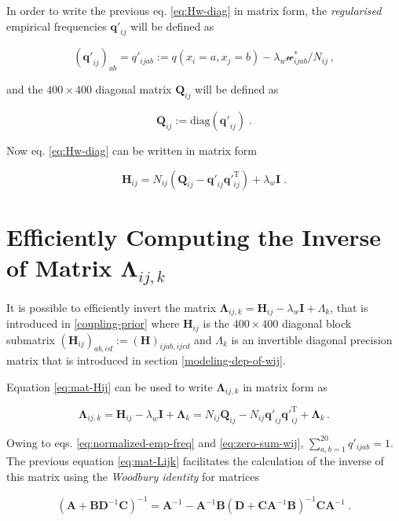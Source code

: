 \documentclass[12pt,a4paper,twoside]{book}
\newcommand{\eq}{\!=\!}
\renewcommand{\H}{\mathbf{H}}
\newcommand{\I}{\mathbf{I}}
\newcommand{\Lijk}{\mathbf{\Lambda}_{ij,k}}
\newcommand{\Lk}{\mathbf{\Lambda}_k}
\newcommand{\Qij}{\mathbf{Q}_{ij}}
\newcommand{\qij}{\mathbf{q\prime}_{ij}}
\newcommand{\wijab}{\mathcal{w}_{ijab}}
\theoremstyle{definition}
\theoremstyle{definition}
\theoremstyle{remark}
\begin{document}
In order to write the previous eq. \eqref{eq:Hw-diag} in matrix form, the
\emph{regularised} empirical frequencies \(\qij\) will be defined as

\begin{equation}
    (\qij)_{ab} = q'_{ijab} := q(x_i \eq a, x_j \eq b) - \lambda_w  \wijab^* / N_{ij} \,,
\end{equation}

and the \(400 \times 400\) diagonal matrix \(\Qij\) will be defined as

\begin{equation}
    \Qij := \text{diag}(\qij) \; .
\end{equation}

Now eq. \eqref{eq:Hw-diag} can be written in matrix form

\begin{equation}
     \H_{ij} = N_{ij} \left( \Qij -  \qij \qij^{\mathrm{T}} \right)  + \lambda_w \I \; .
\label{eq:mat-Hij}
\end{equation}

\section{\texorpdfstring{Efficiently Computing the Inverse of Matrix
\(\Lijk\)}{Efficiently Computing the Inverse of Matrix \textbackslash{}Lijk}}\label{inv-lambda-ij-k}

It is possible to efficiently invert the matrix
\(\Lijk = \H_{ij} - \lambda_w \I + \Lambda_k\), that is introduced in
\ref{coupling-prior} where \(\H_{ij}\) is the \(400 \times 400\)
diagonal block submatrix \((\H_{ij})_{ab,cd} := (\H)_{ijab,ijcd}\) and
\(\Lambda_k\) is an invertible diagonal precision matrix that is
introduced in section \ref{modeling-dep-of-wij}.

Equation \eqref{eq:mat-Hij} can be used to write \(\Lijk\) in matrix form
as

\begin{equation}
     \Lijk = \H_{ij} - \lambda_w \I + \Lk = N_{ij} \Qij- N_{ij} \qij \qij^{\mathrm{T}} + \Lk \,.
\label{eq:mat-Lijk}
\end{equation}

Owing to eqs. \eqref{eq:normalized-emp-freq} and \eqref{eq:zero-sum-wij},
\(\sum_{a,b=1}^{20} q'_{ijab} = 1\). The previous equation
\eqref{eq:mat-Lijk} facilitates the calculation of the inverse of this
matrix using the \emph{Woodbury identity} for matrices

\begin{equation}
    (\mathbf{A} + \mathbf{B} \mathbf{D}^{-1} \mathbf{C})^{-1} = \mathbf{A}^{-1} - \mathbf{A}^{-1} \mathbf{B} (\mathbf{D} + \mathbf{C} \mathbf{A}^{-1} \mathbf{B}) ^{-1} \mathbf{C} \mathbf{A}^{-1} \;. 
\end{equation}
\end{document}

